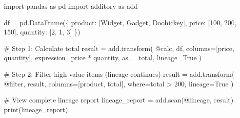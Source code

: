 \documentclass[
  letterpaper,
]{scrbook}
\newenvironment{Shaded}{\begin{snugshade}}{\end{snugshade}}
\newcommand{\BuiltInTok}[1]{\textcolor[rgb]{0.00,0.23,0.31}{#1}}
\newcommand{\CommentTok}[1]{\textcolor[rgb]{0.37,0.37,0.37}{#1}}
\newcommand{\DecValTok}[1]{\textcolor[rgb]{0.68,0.00,0.00}{#1}}
\newcommand{\ImportTok}[1]{\textcolor[rgb]{0.00,0.46,0.62}{#1}}
\newcommand{\NormalTok}[1]{\textcolor[rgb]{0.00,0.23,0.31}{#1}}
\newcommand{\OperatorTok}[1]{\textcolor[rgb]{0.37,0.37,0.37}{#1}}
\newcommand{\StringTok}[1]{\textcolor[rgb]{0.13,0.47,0.30}{#1}}
\newcommand{\VariableTok}[1]{\textcolor[rgb]{0.07,0.07,0.07}{#1}}
\begin{document}
\begin{Shaded}
\begin{Highlighting}[]
\ImportTok{import}\NormalTok{ pandas }\ImportTok{as}\NormalTok{ pd}
\ImportTok{import}\NormalTok{ additory }\ImportTok{as}\NormalTok{ add}

\NormalTok{df }\OperatorTok{=}\NormalTok{ pd.DataFrame(\{}
    \StringTok{\textquotesingle{}product\textquotesingle{}}\NormalTok{: [}\StringTok{\textquotesingle{}Widget\textquotesingle{}}\NormalTok{, }\StringTok{\textquotesingle{}Gadget\textquotesingle{}}\NormalTok{, }\StringTok{\textquotesingle{}Doohickey\textquotesingle{}}\NormalTok{],}
    \StringTok{\textquotesingle{}price\textquotesingle{}}\NormalTok{: [}\DecValTok{100}\NormalTok{, }\DecValTok{200}\NormalTok{, }\DecValTok{150}\NormalTok{],}
    \StringTok{\textquotesingle{}quantity\textquotesingle{}}\NormalTok{: [}\DecValTok{2}\NormalTok{, }\DecValTok{1}\NormalTok{, }\DecValTok{3}\NormalTok{]}
\NormalTok{\})}

\CommentTok{\# Step 1: Calculate total}
\NormalTok{result }\OperatorTok{=}\NormalTok{ add.transform(}
    \StringTok{\textquotesingle{}@calc\textquotesingle{}}\NormalTok{,}
\NormalTok{    df,}
\NormalTok{    columns}\OperatorTok{=}\NormalTok{[}\StringTok{\textquotesingle{}price\textquotesingle{}}\NormalTok{, }\StringTok{\textquotesingle{}quantity\textquotesingle{}}\NormalTok{],}
\NormalTok{    expression}\OperatorTok{=}\StringTok{\textquotesingle{}price * quantity\textquotesingle{}}\NormalTok{,}
\NormalTok{    as\_}\OperatorTok{=}\StringTok{\textquotesingle{}total\textquotesingle{}}\NormalTok{,}
\NormalTok{    lineage}\OperatorTok{=}\VariableTok{True}
\NormalTok{)}

\CommentTok{\# Step 2: Filter high{-}value items (lineage continues)}
\NormalTok{result }\OperatorTok{=}\NormalTok{ add.transform(}
    \StringTok{\textquotesingle{}@filter\textquotesingle{}}\NormalTok{,}
\NormalTok{    result,}
\NormalTok{    columns}\OperatorTok{=}\NormalTok{[}\StringTok{\textquotesingle{}product\textquotesingle{}}\NormalTok{, }\StringTok{\textquotesingle{}total\textquotesingle{}}\NormalTok{],}
\NormalTok{    where}\OperatorTok{=}\StringTok{\textquotesingle{}total \textgreater{} 200\textquotesingle{}}\NormalTok{,}
\NormalTok{    lineage}\OperatorTok{=}\VariableTok{True}
\NormalTok{)}

\CommentTok{\# View complete lineage report}
\NormalTok{lineage\_report }\OperatorTok{=}\NormalTok{ add.scan(}\StringTok{\textquotesingle{}@lineage\textquotesingle{}}\NormalTok{, result)}
\BuiltInTok{print}\NormalTok{(lineage\_report)}
\end{Highlighting}
\end{Shaded}
\end{document}
